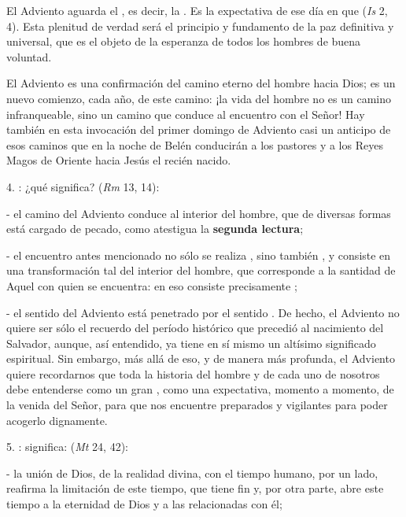 \begin{body}
	El Adviento aguarda el , es decir, la . Es la expectativa de ese día en que  (\emph{Is} 2, 4). Esta plenitud de verdad será el principio y fundamento de la paz definitiva y universal, que es el objeto de la esperanza de todos los hombres de buena voluntad. 
	
	El Adviento es una confirmación del camino eterno del hombre hacia Dios; es un nuevo comienzo, cada año, de este camino: ¡la vida del hombre no es un camino infranqueable, sino un camino que conduce al encuentro con el Señor! Hay también en esta invocación del primer domingo de Adviento casi un anticipo de esos caminos que en la noche de Belén conducirán a los pastores y a los Reyes Magos de Oriente hacia Jesús el recién nacido. 
	
	4. : ¿qué significa?  (\emph{Rm} 13, 14): 
	
	- el camino del Adviento conduce al interior del hombre, que de diversas formas está cargado de pecado, como atestigua la \textbf{segunda lectura}; 
	
	- el encuentro antes mencionado no sólo se realiza , sino también , y consiste en una transformación tal del interior del hombre, que corresponde a la santidad de Aquel con quien se encuentra: en eso consiste precisamente ; 
	
	- el sentido  del Adviento está penetrado por el sentido . De hecho, el Adviento no quiere ser sólo el recuerdo del período histórico que precedió al nacimiento del Salvador, aunque, así entendido, ya tiene en sí mismo un altísimo significado espiritual. Sin embargo, más allá de eso, y de manera más profunda, el Adviento quiere recordarnos que toda la historia del hombre y de cada uno de nosotros debe entenderse como un gran , como una expectativa, momento a momento, de la venida del Señor, para que nos encuentre preparados y vigilantes para poder acogerlo dignamente. 
	
	5. : significa:  (\emph{Mt} 24, 42): 
	
	- la unión de Dios, de la realidad divina, con el tiempo humano, por un lado, reafirma la limitación de este tiempo, que tiene fin y, por otra parte, abre este tiempo a la eternidad de Dios y a las  relacionadas con él; 
	

\end{body}
